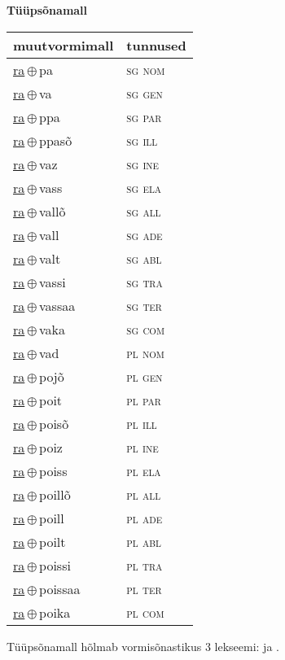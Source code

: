 

\vspace{3.5em}
\noindent \begin{minipage}{\textwidth}
\noindent \textbf{Tüüpsõnamall \,}\\

\begin{sideways}
\begin{tabular}{l l}
muutvormimall & tunnused \\
\hline
\underline{ra}\,$\oplus$\,pa & \textsc{ sg nom } \\
\underline{ra}\,$\oplus$\,va & \textsc{ sg gen } \\
\underline{ra}\,$\oplus$\,ppa & \textsc{ sg par } \\
\underline{ra}\,$\oplus$\,ppasõ & \textsc{ sg ill } \\
\underline{ra}\,$\oplus$\,vaz & \textsc{ sg ine } \\
\underline{ra}\,$\oplus$\,vass & \textsc{ sg ela } \\
\underline{ra}\,$\oplus$\,vallõ & \textsc{ sg all } \\
\underline{ra}\,$\oplus$\,vall & \textsc{ sg ade } \\
\underline{ra}\,$\oplus$\,valt & \textsc{ sg abl } \\
\underline{ra}\,$\oplus$\,vassi & \textsc{ sg tra } \\
\underline{ra}\,$\oplus$\,vassaa & \textsc{ sg ter } \\
\underline{ra}\,$\oplus$\,vaka & \textsc{ sg com } \\
\underline{ra}\,$\oplus$\,vad & \textsc{ pl nom } \\
\underline{ra}\,$\oplus$\,pojõ & \textsc{ pl gen } \\
\underline{ra}\,$\oplus$\,poit & \textsc{ pl par } \\
\underline{ra}\,$\oplus$\,poisõ & \textsc{ pl ill } \\
\underline{ra}\,$\oplus$\,poiz & \textsc{ pl ine } \\
\underline{ra}\,$\oplus$\,poiss & \textsc{ pl ela } \\
\underline{ra}\,$\oplus$\,poillõ & \textsc{ pl all } \\
\underline{ra}\,$\oplus$\,poill & \textsc{ pl ade } \\
\underline{ra}\,$\oplus$\,poilt & \textsc{ pl abl } \\
\underline{ra}\,$\oplus$\,poissi & \textsc{ pl tra } \\
\underline{ra}\,$\oplus$\,poissaa & \textsc{ pl ter } \\
\underline{ra}\,$\oplus$\,poika & \textsc{ pl com } \\
\end{tabular}
\end{sideways}
\label{tab:tüüpsõnamall-rapa}

\end{minipage}

 
\vspace{1em}
\noindent Tüüpsõnamall  hõlmab vormisõnastikus 3 lekseemi:  ja .
